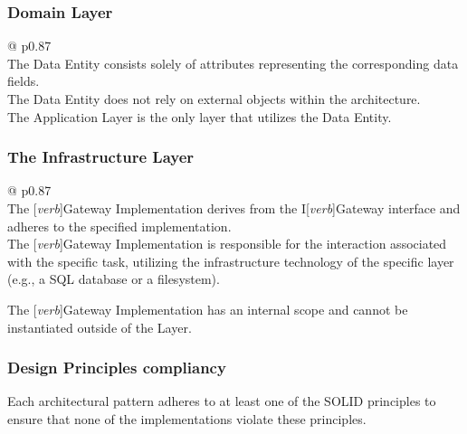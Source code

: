 \subsubsection*{Domain Layer}

\begin{table}[H]
    \begin{tabular}{@{\makebox[2em][c]{\rownumber\space}}  p{0.87\linewidth}}
        \\ 
    \hline
    The Data Entity consists solely of attributes representing the corresponding data
    fields. \\

    The Data Entity does not rely on external objects within the architecture. \\
    
    The Application Layer is the only layer that utilizes the Data Entity. \\
    \hline
    \end{tabular}
\caption{Data Entity Requirements}
\label{table_requirements_data_entity}
\end{table}

\subsubsection*{The Infrastructure Layer}

\begin{table}[H]
    \begin{tabular}{@{\makebox[2em][c]{\rownumber\space}}  p{0.87\linewidth}}
        \\ 
    \hline
    The [\textit{\gls{verb}}]Gateway Implementation derives from the I[\textit{\gls{verb}}]Gateway interface
    and adheres to the specified implementation. \\

    The [\textit{\gls{verb}}]Gateway Implementation is responsible for the interaction
    associated with the specific task, utilizing the infrastructure technology of the
    specific layer (e.g., a SQL database or a filesystem).
    
    The [\textit{\gls{verb}}]Gateway Implementation has an internal scope and cannot be
    instantiated outside of the Layer. \\
    \hline
    \end{tabular}
\caption{\textit{[\gls{verb}]}Gateway Implementation Requirements}
\label{table_requirements_gatewayimplementation}
\end{table}

\subsubsection*{Design Principles compliancy}
Each architectural pattern adheres to at least one of the SOLID principles to ensure that
none of the implementations violate these principles.
